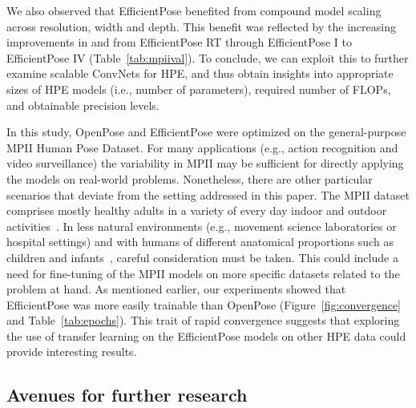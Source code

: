 We also observed that EfficientPose benefited from compound model scaling across resolution, width and depth. This benefit was reflected by the increasing improvements in  and  from EfficientPose RT through EfficientPose I to EfficientPose IV (Table~\ref{tab:mpiival}). To conclude, we can exploit this to further examine scalable ConvNets for HPE, and thus obtain insights into appropriate sizes of HPE models (i.e., number of parameters), required number of FLOPs, and obtainable precision levels.

In this study, OpenPose and EfficientPose were optimized on the general-purpose MPII Human Pose Dataset. For many applications (e.g., action recognition and video surveillance) the variability in MPII may be sufficient for directly applying the models on real-world problems. Nonetheless, there are other particular scenarios that deviate from the setting addressed in this paper. The MPII dataset comprises mostly healthy adults in a variety of every day indoor and outdoor activities~\cite{andriluka14cvpr}. In less natural environments (e.g., movement science laboratories or hospital settings) and with humans of different anatomical proportions such as children and infants~\cite{sciortino2017estimation}, careful consideration must be taken. This could include a need for fine-tuning of the MPII models on more specific datasets related to the problem at hand. As mentioned earlier, our experiments showed that EfficientPose was more easily trainable than OpenPose (Figure~\ref{fig:convergence} and Table~\ref{tab:epochs}). This trait of rapid convergence suggests that exploring the use of transfer learning on the EfficientPose models on other HPE data could provide interesting results. 

\subsection{Avenues for further research}
\label{sec:avenues}

